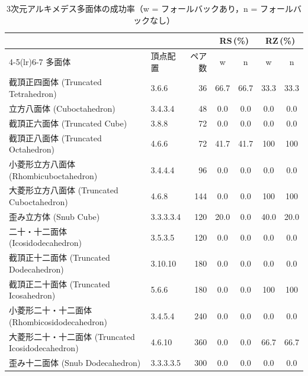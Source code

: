 \documentclass[12pt,a4paper]{article}
\theoremstyle{definition}
\begin{document}
\begin{table}[h]
\centering
\caption{3次元アルキメデス多面体の成功率（w = フォールバックあり，n = フォールバックなし）}
\label{tab:res3darchimedean}
\small
\setlength{\tabcolsep}{3pt}
\begin{tabular}{llrcccc}
\toprule
& & & \multicolumn{2}{c}{RS\,(\%)} & \multicolumn{2}{c}{RZ\,(\%)} \\
\cmidrule(lr){4-5}\cmidrule(lr){6-7}
多面体 & 頂点配置 & ペア数 & w & n & w & n \\
\midrule
截頂正四面体 (Truncated Tetrahedron)       & 3.6.6       &  36 & 66.7 & 66.7 & 33.3 & 33.3 \\
立方八面体 (Cuboctahedron)                 & 3.4.3.4     &  48 &  0.0 &  0.0 &  0.0 &  0.0 \\
截頂正六面体 (Truncated Cube)              & 3.8.8       &  72 &  0.0 &  0.0 &  0.0 &  0.0 \\
截頂正八面体 (Truncated Octahedron)        & 4.6.6       &  72 & 41.7 & 41.7 & 100  & 100  \\
小菱形立方八面体 (Rhombicuboctahedron)     & 3.4.4.4     &  96 &  0.0 &  0.0 &  0.0 &  0.0 \\
大菱形立方八面体 (Truncated Cuboctahedron) & 4.6.8       & 144 &  0.0 &  0.0 & 100  & 100  \\
歪み立方体 (Snub Cube)                    & 3.3.3.3.4   & 120 & 20.0 &  0.0 & 40.0 & 20.0 \\
二十・十二面体 (Icosidodecahedron)         & 3.5.3.5     & 120 &  0.0 &  0.0 &  0.0 &  0.0 \\
截頂正十二面体 (Truncated Dodecahedron)    & 3.10.10     & 180 &  0.0 &  0.0 &  0.0 &  0.0 \\
截頂正二十面体 (Truncated Icosahedron)     & 5.6.6       & 180 &  0.0 &  0.0 & 100  & 100  \\
小菱形二十・十二面体 (Rhombicosidodecahedron) & 3.4.5.4  & 240 &  0.0 &  0.0 &  0.0 &  0.0 \\
大菱形二十・十二面体 (Truncated Icosidodecahedron) & 4.6.10 & 360 & 0.0 & 0.0 & 66.7 & 66.7 \\
歪み十二面体 (Snub Dodecahedron)           & 3.3.3.3.5   & 300 &  0.0 &  0.0 &  0.0 &  0.0 \\
\bottomrule
\end{tabular}
\end{table}
\end{document}
